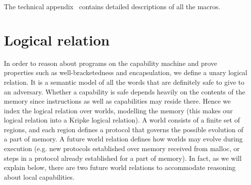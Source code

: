 \documentclass[compsoc,conference,letterpaper,fleqn]{IEEEtran}
\begin{document}
The technical appendix~\cite{technical_appendix} contains detailed descriptions
of all the macros.

\section{Logical relation}
\label{sec:logical-relation}
In order to reason about programs on the capability machine and prove properties
such as well-bracketedness and encapsulation, we define a unary logical
relation.
It is a semantic model of all the words that are definitely safe to give to an
adversary. Whether a capability is safe depends heavily on the contents of the
memory since instructions as well as capabilities may reside there. Hence we
index the logical relation over worlds, modelling the memory (this makes our
logical relation into a Kripke logical relation). A world consists of a finite
set of regions, and each region defines a protocol that governs the possible
evolution of a part of memory. A future world relation defines how worlds may
evolve during execution (e.g. new protocols established over memory received
from malloc, or steps in a protocol already established for a part of memory).
In fact, as we will explain below, there are two future world relations to
accommodate reasoning about local capabilities.
%
\end{document}
